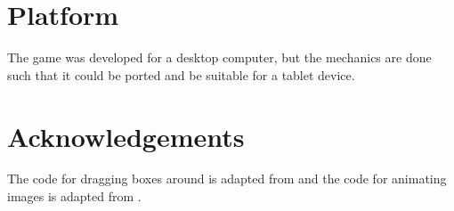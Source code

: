 \documentclass[11pt]{article}
\begin{document}
\section{Platform}
The game was developed for a desktop computer, but the mechanics are done such that it could be ported and be suitable for a tablet device.

\section{Acknowledgements}
The code for dragging boxes around is adapted from \cite{drag} and the code for animating images is adapted from \cite{animation}.

\printbibliography
\end{document}
